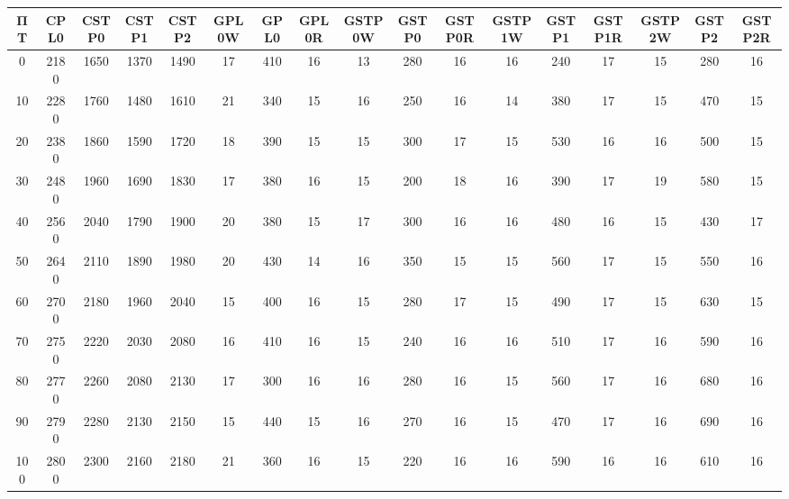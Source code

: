 \begin{tabular}{|c|c|c|c|c|c|c|c|c|c|c|c|c|c|c|c|c|}
\hline
ΠΤ&CPL0&CSTP0&CSTP1&CSTP2&GPL0W&GPL0&GPL0R&GSTP0W&GSTP0&GSTP0R&GSTP1W&GSTP1&GSTP1R&GSTP2W&GSTP2&GSTP2R\\\hline
\hline
0&2180&1650&1370&1490&17&410&16&13&280&16&16&240&17&15&280&16\\
\hline
10&2280&1760&1480&1610&21&340&15&16&250&16&14&380&17&15&470&15\\
\hline
20&2380&1860&1590&1720&18&390&15&15&300&17&15&530&16&16&500&15\\
\hline
30&2480&1960&1690&1830&17&380&16&15&200&18&16&390&17&19&580&15\\
\hline
40&2560&2040&1790&1900&20&380&15&17&300&16&16&480&16&15&430&17\\
\hline
50&2640&2110&1890&1980&20&430&14&16&350&15&15&560&17&15&550&16\\
\hline
60&2700&2180&1960&2040&15&400&16&15&280&17&15&490&17&15&630&15\\
\hline
70&2750&2220&2030&2080&16&410&16&15&240&16&16&510&17&16&590&16\\
\hline
80&2770&2260&2080&2130&17&300&16&16&280&16&15&560&17&16&680&16\\
\hline
90&2790&2280&2130&2150&15&440&15&16&270&16&15&470&17&16&690&16\\
\hline
100&2800&2300&2160&2180&21&360&16&15&220&16&16&590&16&16&610&16\\
\hline
\end{tabular}
